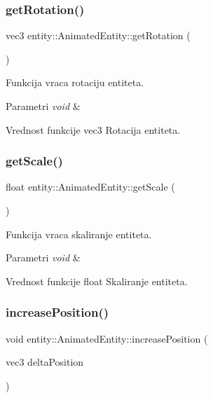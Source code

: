 \subsubsection{\texorpdfstring{get\+Rotation()}{getRotation()}}
{\footnotesize\ttfamily vec3 entity\+::\+Animated\+Entity\+::get\+Rotation (\begin{DoxyParamCaption}{ }\end{DoxyParamCaption})}



Funkcija vraca rotaciju entiteta. 


\begin{DoxyParams}{Parametri}
{\em void} & \\
\hline
\end{DoxyParams}
\begin{DoxyReturn}{Vrednost funkcije}
vec3 Rotacija entiteta. 
\end{DoxyReturn}
\mbox{\label{classentity_1_1AnimatedEntity_ab50284046aa25cb7d264f9341cf904a5}} 
\subsubsection{\texorpdfstring{get\+Scale()}{getScale()}}
{\footnotesize\ttfamily float entity\+::\+Animated\+Entity\+::get\+Scale (\begin{DoxyParamCaption}{ }\end{DoxyParamCaption})}



Funkcija vraca skaliranje entiteta. 


\begin{DoxyParams}{Parametri}
{\em void} & \\
\hline
\end{DoxyParams}
\begin{DoxyReturn}{Vrednost funkcije}
float Skaliranje entiteta. 
\end{DoxyReturn}
\mbox{\label{classentity_1_1AnimatedEntity_a525fd1a4aaa4019d28e224323ce536ef}} 
\subsubsection{\texorpdfstring{increase\+Position()}{increasePosition()}}
{\footnotesize\ttfamily void entity\+::\+Animated\+Entity\+::increase\+Position (\begin{DoxyParamCaption}\item[{vec3}]{delta\+Position }\end{DoxyParamCaption})}



